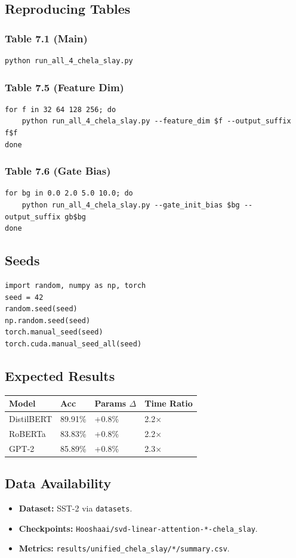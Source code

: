 \subsection{Reproducing Tables}

\subsubsection{Table 7.1 (Main)}
\begin{lstlisting}
python run_all_4_chela_slay.py
\end{lstlisting}

\subsubsection{Table 7.5 (Feature Dim)}
\begin{lstlisting}
for f in 32 64 128 256; do
    python run_all_4_chela_slay.py --feature_dim $f --output_suffix f$f
done
\end{lstlisting}

\subsubsection{Table 7.6 (Gate Bias)}
\begin{lstlisting}
for bg in 0.0 2.0 5.0 10.0; do
    python run_all_4_chela_slay.py --gate_init_bias $bg --output_suffix gb$bg
done
\end{lstlisting}

\subsection{Seeds}

\begin{lstlisting}
import random, numpy as np, torch
seed = 42
random.seed(seed)
np.random.seed(seed)
torch.manual_seed(seed)
torch.cuda.manual_seed_all(seed)
\end{lstlisting}

\subsection{Expected Results}

\begin{table}[H]
\centering
\small
\begin{tabular}{llll}
\toprule
\textbf{Model} & \textbf{Acc} & \textbf{Params $\Delta$} & \textbf{Time Ratio} \\
\midrule
DistilBERT & 89.91\% & +0.8\% & 2.2$\times$ \\
RoBERTa & 83.83\% & +0.8\% & 2.2$\times$ \\
GPT-2 & 85.89\% & +0.8\% & 2.3$\times$ \\
\bottomrule
\end{tabular}
\end{table}

\subsection{Data Availability}

\begin{itemize}
\item \textbf{Dataset:} SST-2 via \texttt{datasets}.
\item \textbf{Checkpoints:} \texttt{Hooshaai/svd-linear-attention-*-chela\_slay}.
\item \textbf{Metrics:} \texttt{results/unified\_chela\_slay/*/summary.csv}.

\end{itemize}
